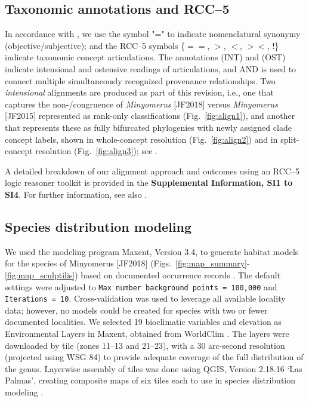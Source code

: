 \documentclass[fleqn,10pt,lineno]{wlpeerj} %
\begin{document}
	\subsection*{Taxonomic annotations and RCC--5}\label{ssec:taxanno} 
		In accordance with \citet{jansen2015}, we use the symbol "=" to indicate nomenclatural synonymy (objective/subjective); and the RCC--5 symbols \{$==$, $>$, $<$, $><$, !\} indicate taxonomic concept articulations.
		The annotations (INT) and (OST) indicate intensional and ostensive readings of articulations, and AND is used to connect multiple simultaneously recognized provenance relationships.
		Two \emph{intensional} alignments are produced as part of this revision, i.e., one that captures the non-/congruence of \textit{Minyomerus} [JF2018] versus \textit{Minyomerus} [JF2015] represented as rank-only classifications (Fig.~\ref{fig:align1}), and another that represents these as fully bifurcated phylogenies with newly assigned clade concept labels, shown in whole-concept resolution (Fig.~\ref{fig:align2}) and in split-concept resolution (Fig.~\ref{fig:align3}); see \citet{fea2018}.
		
		A detailed breakdown of our alignment approach and outcomes using an RCC--5 logic reasoner toolkit \citep{chen2014} is provided in the \textbf{Supplemental Information, SI1 to SI4}. For further information, see also \citet{jansen2015, fea2016a, fea2016b}.
	
	\subsection*{Species distribution modeling}\label{ssec:dismo} 
		We used the modeling program Maxent, Version 3.4, to generate habitat models for the species of Minyomerus [JF2018] (Figs.~\ref{fig:map_summary}-\ref{fig:map_sculptilis}) based on documented occurrence records \citep{phillips2004, phillips2006, elith2011}.
		The default settings were adjusted to \texttt{Max number background points = 100,000} and \texttt{Iterations = 10}.
		Cross-validation was used to leverage all available locality data; however, no models could be created for species with two or fewer documented localities.
		We selected 19 bioclimatic variables and elevation as Environmental Layers in Maxent, obtained from WorldClim \citep{hijmans2005}.
		The layers were downloaded by tile (zones 11–13 and 21–23), with a 30 arc-second resolution (projected using WSG 84) to provide adequate coverage of the full distribution of the genus.
		Layerwise assembly of tiles was done using QGIS, Version 2.18.16 `Las Palmas', creating composite maps of six tiles each to use in species distribution modeling \citep{qgis2018}.
		
\end{document}
